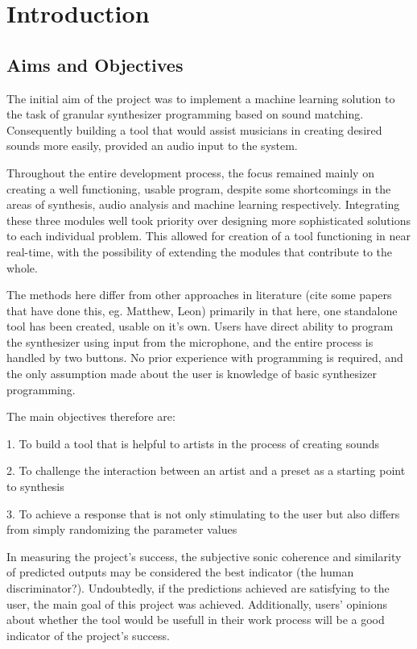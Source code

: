 \chapter{Introduction}
\section{Aims and Objectives}

The initial aim of the project was to implement a machine learning
solution to the task of granular synthesizer programming based on
sound matching. Consequently building a tool that would assist
musicians in creating desired sounds more easily, provided an audio input to the system.

Throughout the entire development process, the focus remained mainly
on creating a well functioning, usable program, despite some
shortcomings in the areas of synthesis, audio analysis and machine
learning respectively. Integrating these three modules well took
priority over designing more sophisticated solutions to each
individual problem. This allowed for creation of a tool
functioning in near real-time, with the possibility of extending the
modules that contribute to the whole.

The methods here differ from other approaches in literature (cite some
papers that have done this, eg. Matthew, Leon) primarily in that here,
one standalone tool has been created, usable on it's
own. Users have direct ability to program the synthesizer using input
from the microphone, and the entire process is handled by two
buttons. No prior experience with programming is required, and the
only assumption made about the user is knowledge of basic synthesizer
programming.

The main objectives therefore are:

1. To build a tool that is helpful to artists in the process of
creating sounds 

2. To challenge the interaction between an artist and a preset as a
starting point to synthesis 

3. To achieve a response that is not only stimulating to the user but
also differs from simply randomizing the parameter values

In measuring the project's success, the subjective sonic coherence and
similarity of predicted outputs may be considered the best indicator (the
human discriminator?). Undoubtedly, if the predictions achieved are
satisfying to the user, the main goal of this project was
achieved. Additionally, users' opinions about whether the tool would
be usefull in their work process will be a good indicator of the
project's success.

